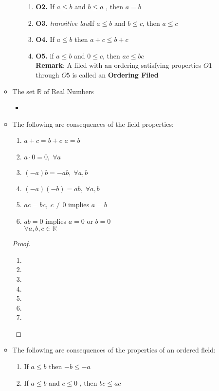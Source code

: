 \documentclass[12pt]{article}
\begin{document}
\begin{enumerate}
\begin{itemize}
\begin{itemize}
\begin{enumerate}
		\item\textbf{O2.} If $a\leq b$ and $b\leq a$ , then $a=b$
		\item\textbf{O3.} \textit{transitive law}If $a\leq b$ and $b\leq c$, then $a\leq c$
		\item\textbf{O4.} If $a\leq b$ then $a+c\leq b+c$
		\item\textbf{O5.} if $a\leq b$ and $0\leq c$, then $ac\leq bc$
		\\ \textbf{Remark}: A filed with an ordering satisfying properties $O1$ through $O5$ is called an \textbf{Ordering Filed} 
\end{enumerate}			
		\end{itemize}
		\item The set $\mathbb{R}$ of Real Numbers
			\begin{itemize}
			\item
			\end{itemize}
		\item The following are consequences of the field properties:
			\begin{enumerate}
			\item $a+c=b+c$ $a=b$
			\item $a\cdot 0=0,\;\forall a$
			\item $(-a)b=-ab,\;\forall a,b$
			\item $(-a)(-b)=ab,\;\forall a,b$
			\item $ac=bc,\; c\not=0$ implies $a=b$
			\item $ab=0$ implies $a=0$ or $b=0$\\$\forall a,b,c \in \mathbb{R}$
			\end{enumerate}
	\begin{proof}
	\begin{enumerate}
	\item 
	\item
	\item
	\item
	\item
	\item
	\item
	\end{enumerate}
	\end{proof}
	\item The following are consequences of the properties of an ordered field:\\
	\begin{enumerate}
	\item If $a\leq b$ then $-b\leq -a$
	\item If $a\leq b$ and $c\leq 0$ , then $bc\leq ac$

\end{enumerate}
\end{itemize}
\end{enumerate}
\end{document}
